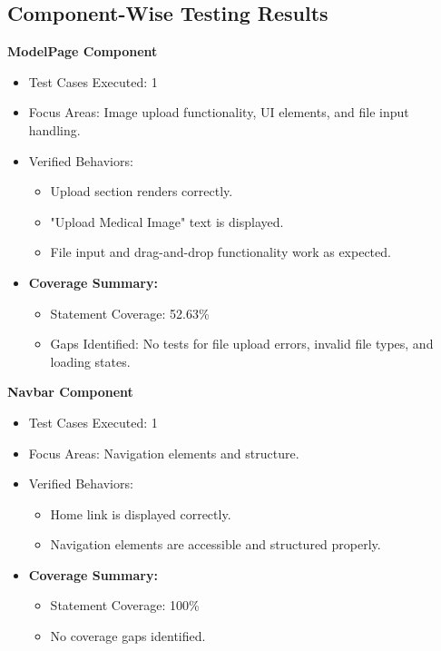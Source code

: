 \documentclass[12pt, titlepage]{article}
\begin{document}
\subsection{Component-Wise Testing Results}

\textbf{ModelPage Component}
\begin{itemize}
    \item Test Cases Executed: 1
    \item Focus Areas: Image upload functionality, UI elements, and file input handling.
    \item Verified Behaviors:
    \begin{itemize}
        \item Upload section renders correctly.
        \item "Upload Medical Image" text is displayed.
        \item File input and drag-and-drop functionality work as expected.
    \end{itemize}
    \item \textbf{Coverage Summary:}
    \begin{itemize}
        \item Statement Coverage: 52.63\%
        \item Gaps Identified: No tests for file upload errors, invalid file types, and loading states.
    \end{itemize}
\end{itemize}

\textbf{Navbar Component}
\begin{itemize}
    \item Test Cases Executed: 1
    \item Focus Areas: Navigation elements and structure.
    \item Verified Behaviors:
    \begin{itemize}
        \item Home link is displayed correctly.
        \item Navigation elements are accessible and structured properly.
    \end{itemize}
    \item \textbf{Coverage Summary:}
    \begin{itemize}
        \item Statement Coverage: 100\%
        \item No coverage gaps identified.
    \end{itemize}
\end{itemize}
\end{document}
